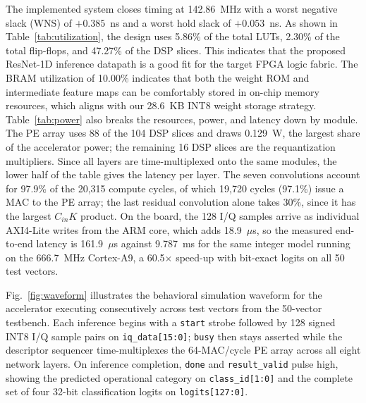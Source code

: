 \documentclass[conference]{IEEEtran}
\begin{document}
The implemented system closes timing at 142.86~MHz with a worst negative slack (WNS) of $+0.385$~ns and a worst hold slack of $+0.053$~ns. As shown in Table~\ref{tab:utilization}, the design uses 5.86\% of the total LUTs, 2.30\% of the total flip-flops, and 47.27\% of the DSP slices. This indicates that the proposed ResNet-1D inference datapath is a good fit for the target FPGA logic fabric. The BRAM utilization of 10.00\% indicates that both the weight ROM and intermediate feature maps can be comfortably stored in on-chip memory resources, which aligns with our 28.6~KB INT8 weight storage strategy. Table~\ref{tab:power} also breaks the resources, power, and latency down by module. The PE array uses 88 of the 104 DSP slices and draws 0.129~W, the largest share of the accelerator power; the remaining 16 DSP slices are the requantization multipliers. Since all layers are time-multiplexed onto the same modules, the lower half of the table gives the latency per layer. The seven convolutions account for 97.9\% of the 20,315 compute cycles, of which 19,720 cycles (97.1\%) issue a MAC to the PE array; the last residual convolution alone takes 30\%, since it has the largest $C_{in}K$ product. On the board, the 128 I/Q samples arrive as individual AXI4-Lite writes from the ARM core, which adds 18.9~$\mu$s, so the measured end-to-end latency is 161.9~$\mu$s against 9.787~ms for the same integer model running on the 666.7~MHz Cortex-A9, a 60.5$\times$ speed-up with bit-exact logits on all 50 test vectors. %

Fig.~\ref{fig:waveform} illustrates the behavioral simulation waveform for the accelerator executing consecutively across test vectors from the 50-vector testbench. Each inference begins with a \texttt{start} strobe followed by 128 signed INT8 I/Q sample pairs on \texttt{iq\_data[15:0]}; \texttt{busy} then stays asserted while the descriptor sequencer time-multiplexes the 64-MAC/cycle PE array across all eight network layers. On inference completion, \texttt{done} and \texttt{result\_valid} pulse high, showing the predicted operational category on \texttt{class\_id[1:0]} and the complete set of four 32-bit classification logits on \texttt{logits[127:0]}.%
\end{document}
